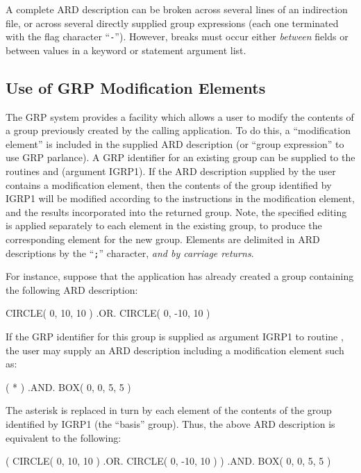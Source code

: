 \documentclass[11pt]{starlink}
\begin{document}
A complete ARD description can be broken across several lines of an indirection
file, or across several directly supplied group expressions (each one terminated
with the flag character ``\verb+-+''). However, breaks must occur either
\emph{between} fields or between values in a keyword or statement argument list.

\subsection{\label{SEC:MOD}Use of GRP Modification Elements}
The GRP system provides a facility which allows a user to modify the
contents of a group previously created by the calling application. To do
this, a ``modification element'' is included in the supplied ARD
description (or ``group expression'' to use GRP parlance). A GRP
identifier for an existing group can be supplied to the routines
 and 
(argument IGRP1). If the ARD description supplied by the user contains a
modification element, then the contents of the group identified by IGRP1
will be modified according to the instructions in the modification
element, and the results incorporated into the returned group. Note, the
specified editing is applied separately to each element in the existing
group, to produce the corresponding element for the new group. Elements are
delimited in ARD descriptions by the ``\verb+;+'' character, \emph{and by
carriage returns}.

For instance, suppose that the application has already created a group
containing the following ARD description:

\small
\begin{terminalv}
      CIRCLE( 0, 10, 10 ) .OR. CIRCLE( 0, -10, 10 )
\end{terminalv}
\normalsize

If the GRP identifier for this group is supplied as argument IGRP1 to
routine , the user may supply an ARD
description including a modification element such as:

\small
\begin{terminalv}
      ( * ) .AND. BOX( 0, 0, 5, 5 )
\end{terminalv}
\normalsize

The asterisk is replaced in turn by each element of the contents of the
group identified by IGRP1 (the ``basis'' group).
Thus, the above ARD description is equivalent to the following:

\small
\begin{terminalv}
      ( CIRCLE( 0, 10, 10 ) .OR. CIRCLE( 0, -10, 10 ) ) .AND. BOX( 0, 0, 5, 5 )
\end{terminalv}
\normalsize
\end{document}
